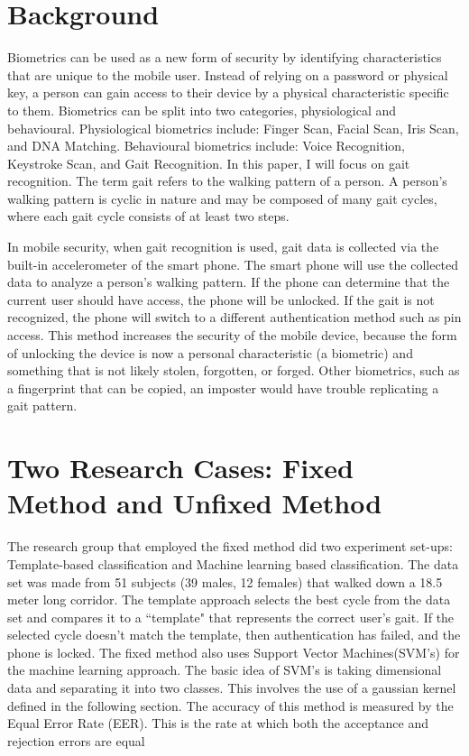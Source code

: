 \documentclass{sig-alternate}
\begin{document}
\section{Background}
	Biometrics can be used as a new form of security by identifying characteristics that are unique to the mobile user. Instead of relying on a password or physical key, a person can gain access to their device by a physical characteristic specific to them. Biometrics can be split into two categories, physiological and behavioural. Physiological biometrics include: Finger Scan, Facial Scan, Iris Scan, and DNA Matching. Behavioural biometrics include: Voice Recognition, Keystroke Scan, and Gait Recognition. In this paper, I will focus on gait recognition. The term gait refers to the walking pattern of a person. A person's walking pattern is cyclic in nature and may be composed of many gait cycles, where each gait cycle consists of at least two steps.~\cite{Sujithra:2012} 
	
	In mobile security, when gait recognition is used, gait data is collected via the built-in accelerometer of the smart phone. The smart phone will use the collected data to analyze a person's walking pattern. If the phone can determine that the current user should have access, the phone will be unlocked. If the gait is not recognized, the phone will switch to a different authentication method such as pin access. This method increases the security of the mobile device, because the form of unlocking the device is now a personal characteristic (a biometric) and something that is not likely stolen, forgotten, or forged. Other biometrics, such as a fingerprint that can be copied, an imposter would have trouble replicating a gait pattern.



\section{Two Research Cases: Fixed \\ Method and Unfixed Method}
	The research group that employed the fixed method did two experiment set-ups: Template-based classification and Machine learning based classification. The data set was made from 51 subjects (39 males, 12 females) that walked down a 18.5 meter long corridor. The template approach selects the best cycle from the data set and compares it to a ``template" that represents the correct user's gait. If the selected cycle doesn't match the template, then authentication has failed, and the phone is locked.  The fixed method also uses Support Vector Machines(SVM's) for the machine learning approach. The basic idea of SVM's is taking dimensional data and separating it into two classes. This involves the use of a gaussian kernel defined in the following section. The accuracy of this method is measured by the Equal Error Rate (EER). This is the rate at which both the acceptance and rejection errors are equal
	
\end{document}
